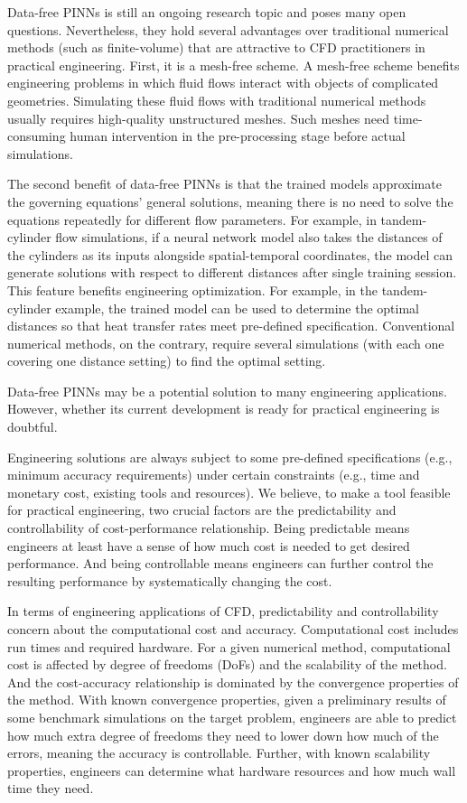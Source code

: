 
Data-free PINNs is still an ongoing research topic and poses many open questions.
Nevertheless, they hold several advantages over traditional numerical methods (such as finite-volume) that are attractive to CFD practitioners in practical engineering.
First, it is a mesh-free scheme.
A mesh-free scheme benefits engineering problems in which fluid flows interact with objects of complicated geometries.
Simulating these fluid flows with traditional numerical methods usually requires high-quality unstructured meshes.
Such meshes need time-consuming human intervention in the pre-processing stage before actual simulations.

The second benefit of data-free PINNs is that the trained models approximate the governing equations' general solutions, meaning there is no need to solve the equations repeatedly for different flow parameters.
For example, in tandem-cylinder flow simulations, if a neural network model also takes the distances of the cylinders as its inputs alongside spatial-temporal coordinates, the model can generate solutions with respect to different distances after single training session.
This feature benefits engineering optimization.
For example, in the tandem-cylinder example, the trained model can be used to determine the optimal distances so that heat transfer rates meet pre-defined specification.
Conventional numerical methods, on the contrary, require several simulations (with each one covering one distance setting) to find the optimal setting.

Data-free PINNs may be a potential solution to many engineering applications.
However, whether its current development is ready for practical engineering is doubtful.

Engineering solutions are always subject to some pre-defined specifications (e.g., minimum accuracy requirements) under certain constraints (e.g., time and monetary cost, existing tools and resources).
We believe, to make a tool feasible for practical engineering, two crucial factors are the predictability and controllability of cost-performance relationship. 
Being predictable means engineers at least have a sense of how much cost is needed to get desired performance.
And being controllable means engineers can further control the resulting performance by systematically changing the cost.

In terms of engineering applications of CFD, predictability and controllability concern about the computational cost and accuracy.
Computational cost includes run times and required hardware.
For a given numerical method, computational cost is affected by degree of freedoms (DoFs) and the scalability of the method.
And the cost-accuracy relationship is dominated by the convergence properties of the method.
With known convergence properties, given a preliminary results of some benchmark simulations on the target problem, engineers are able to predict how much extra degree of freedoms they need to lower down how much of the errors, meaning the accuracy is controllable.
Further, with known scalability properties, engineers can determine what hardware resources and how much wall time they need.


